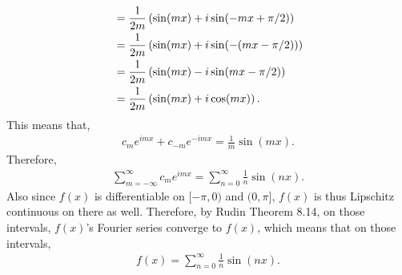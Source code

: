\documentclass[12pt]{article}
\begin{document}
\begin{fproof}[3(a)]
\begin{align*}
   &=\frac{1}{2m} \left( \sin(mx) + i\sin(-mx + \pi/2) \right)\\
   &= \frac{1}{2m} \left( \sin(mx) + i\sin(-(mx - \pi/2)) \right)\\
   &=\frac{1}{2m} \left( \sin(mx) - i\sin(mx - \pi/2) \right)\\
   &=\frac{1}{2m} \left( \sin(mx) + i\cos(mx) \right).
 \end{align*}
 This means that,
 \begin{align*}
   c_m e^{imx} + c_{-m}e^{-imx} = \frac{1}{m} \sin(mx).
 \end{align*}
 Therefore,
 \begin{align*}
   \sum_{m = -\infty}^{\infty} c_m e^{imx} = \sum_{n=0}^{\infty} \frac{1}{n} \sin(nx).
 \end{align*}
 Also since \(f(x)\) is differentiable on \([-\pi, 0)\) and \((0, \pi]\), \(f(x)\) is thus Lipschitz continuous on there as well.
 Therefore, by Rudin Theorem 8.14, on those intervals, \(f(x)\)'s Fourier series converge to \(f(x)\), which means that on those intervals,
 \begin{align*}
   f(x) = \sum_{n=0}^{\infty} \frac{1}{n} \sin(nx).
 \end{align*}

\end{fproof}

\begin{fproof}[3(b)]
 
\end{fproof}

\begin{fproof}[3(c)]
 
\end{fproof}
\newpage
\end{document}

